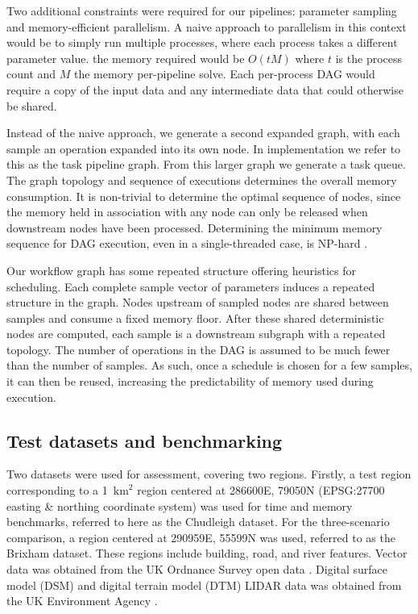 \documentclass[11pt, a4paper]{article}
\begin{document}
Two additional constraints were required for our pipelines: parameter sampling and 
memory-efficient parallelism.
A naive approach to parallelism in this context would be to simply run multiple processes,
where each process takes a different parameter value.
the memory required would be $O(tM)$ where $t$
is the process count and $M$ the memory per-pipeline solve. Each per-process DAG would
require a copy of the input data and any intermediate data that could otherwise be shared.

Instead of the naive approach, we generate a second expanded graph,
with each sample an operation expanded into its own node.
In implementation we refer to this as the task pipeline graph.
From this larger graph we generate a task queue. 
The graph topology and sequence of executions determines the
overall memory consumption. 
It is non-trivial to determine the optimal sequence of nodes, since the memory
held in association with any node can only be released when downstream nodes have been processed.
Determining the minimum memory sequence for DAG execution, even in a single-threaded case, is NP-hard \cite{marchal2019limiting}.

Our workflow graph has some repeated structure offering heuristics for scheduling. 
Each complete sample vector of parameters induces a repeated structure in the graph.
Nodes upstream of sampled nodes are shared between samples and consume a fixed memory floor.
After these shared deterministic nodes are computed, each sample is a downstream subgraph with a repeated 
topology. The number of operations in the DAG is assumed to be much fewer than the number of samples.
As such, once a schedule is chosen for a few samples, it can then be reused, increasing
the predictability of memory used during execution.

\subsection{Test datasets and benchmarking}

Two datasets were used for assessment, covering two regions.
Firstly, a test region corresponding to a 1~$\text{km}^2$ region centered at
286600E, 79050N (EPSG:27700 easting \& northing coordinate system) was used for time and memory benchmarks, referred to here as the Chudleigh dataset.
For the three-scenario comparison, a region centered at 290959E, 55599N was used, referred to as the Brixham dataset.
These regions include building, road, and river features. Vector data was obtained from
the UK Ordnance Survey open data \cite{os_data}.
Digital surface model (DSM) and digital terrain model (DTM) LIDAR data was obtained from the UK Environment Agency \cite{ea_lidar_composite_2022}.
\end{document}
